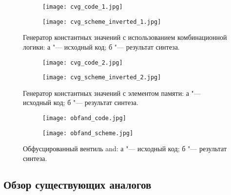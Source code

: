 \begin{figure}[ht]
\centering
  \begin{subfigure}[b]{1\textwidth}
    \centering
    \texttt{[image: cvg\_code\_1.jpg]}
    \caption{}
  \end{subfigure}
  \begin{subfigure}[b]{1\textwidth}
    \centering
    \texttt{[image: cvg\_scheme\_inverted\_1.jpg]}
    \caption{}
  \end{subfigure}
  \caption{ Генератор константных значений с использованием комбинационной логики: а "--- исходный код;
            б "--- результат синтеза.}
  \label{fig:fire_alarms}
\end{figure}



\begin{figure}[ht]
\centering
  \begin{subfigure}[b]{1\textwidth}
    \centering
    \texttt{[image: cvg\_code\_2.jpg]}
    \caption{}
  \end{subfigure}
  \begin{subfigure}[b]{1\textwidth}
    \centering
    \texttt{[image: cvg\_scheme\_inverted\_2.jpg]}
    \caption{}
  \end{subfigure}
  \caption{ Генератор константных значений с элементом памяти: а "--- исходный код;
            б "--- результат синтеза.}
  \label{fig:fire_alarms}
\end{figure}





\begin{figure}[ht]
\centering
  \begin{subfigure}[p]{1\textwidth}
    \centering
    \texttt{[image: obfand\_code.jpg]}
    \caption{}
  \end{subfigure}
  \begin{subfigure}[b]{1\textwidth}
    \centering
    \texttt{[image: obfand\_scheme.jpg]}
    \caption{}
  \end{subfigure}
  \caption{ Обфусцированный вентиль and: а "--- исходный код;
            б "--- результат синтеза.}
  \label{fig:fire_alarms}
\end{figure}

\FloatBarrier

\subsection{Обзор существующих аналогов}

